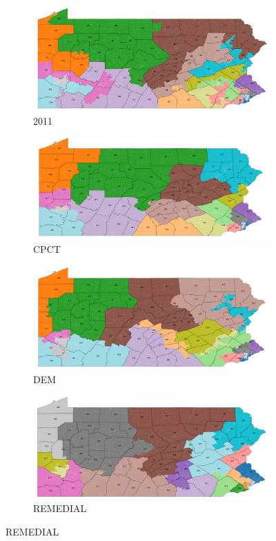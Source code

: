 \documentclass{mgggarticle}
\begin{document}
\begin{figure}[h]
\begin{subfigure}{0.475\textwidth}
\centering
\includegraphics[width=\textwidth]{2011_counties.png}
\caption{2011}
\end{subfigure}
\begin{subfigure}{0.475\textwidth}
\centering
\includegraphics[width=\textwidth]{CPCT_counties.png}
\caption{CPCT}
\end{subfigure}

\begin{subfigure}{0.475\textwidth}
\includegraphics[width=\textwidth]{DEM_counties.png}
\caption{DEM}
\end{subfigure}
\begin{subfigure}{0.475\textwidth}
\includegraphics[width=\textwidth]{REMEDIAL_counties.png}
\caption{REMEDIAL}
\end{subfigure}


\end{figure}
\end{document}
